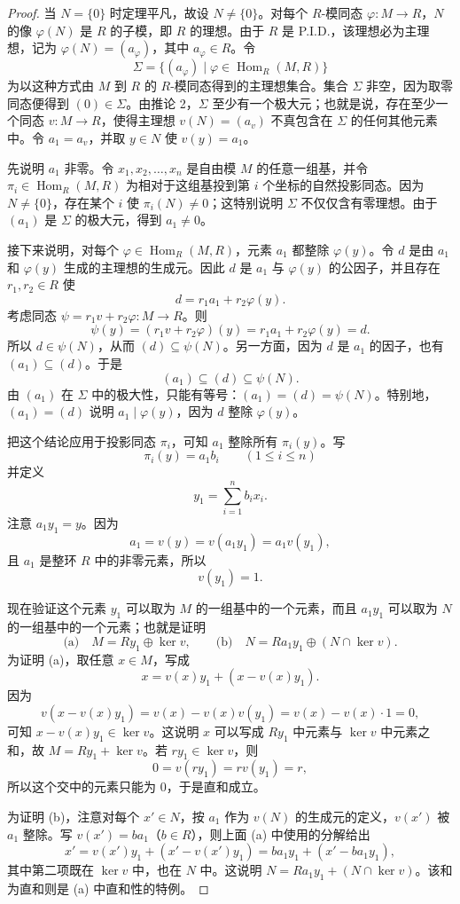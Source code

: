 \begin{proof}
当 $N=\{0\}$ 时定理平凡，故设 $N\neq\{0\}$。对每个 $R$-模同态 $\varphi:M\to R$，$N$ 的像 $\varphi(N)$ 是 $R$ 的子模，即 $R$ 的理想。由于 $R$ 是 P.I.D.，该理想必为主理想，记为 $\varphi(N)=(a_\varphi)$，其中 $a_\varphi\in R$。令
\[
\Sigma=\{(a_\varphi)\mid \varphi\in\operatorname{Hom}_R(M,R)\}
\]
为以这种方式由 $M$ 到 $R$ 的 $R$-模同态得到的主理想集合。集合 $\Sigma$ 非空，因为取零同态便得到 $(0)\in\Sigma$。由推论 2，$\Sigma$ 至少有一个极大元；也就是说，存在至少一个同态 $v:M\to R$，使得主理想 $v(N)=(a_v)$ 不真包含在 $\Sigma$ 的任何其他元素中。令 $a_1=a_v$，并取 $y\in N$ 使 $v(y)=a_1$。

先说明 $a_1$ 非零。令 $x_1,x_2,\ldots,x_n$ 是自由模 $M$ 的任意一组基，并令 $\pi_i\in\operatorname{Hom}_R(M,R)$ 为相对于这组基投到第 $i$ 个坐标的自然投影同态。因为 $N\neq\{0\}$，存在某个 $i$ 使 $\pi_i(N)\neq0$；这特别说明 $\Sigma$ 不仅仅含有零理想。由于 $(a_1)$ 是 $\Sigma$ 的极大元，得到 $a_1\neq0$。

接下来说明，对每个 $\varphi\in\operatorname{Hom}_R(M,R)$，元素 $a_1$ 都整除 $\varphi(y)$。令 $d$ 是由 $a_1$ 和 $\varphi(y)$ 生成的主理想的生成元。因此 $d$ 是 $a_1$ 与 $\varphi(y)$ 的公因子，并且存在 $r_1,r_2\in R$ 使
\[
d=r_1a_1+r_2\varphi(y).
\]
考虑同态 $\psi=r_1v+r_2\varphi:M\to R$。则
\[
\psi(y)=(r_1v+r_2\varphi)(y)=r_1a_1+r_2\varphi(y)=d.
\]
所以 $d\in\psi(N)$，从而 $(d)\subseteq\psi(N)$。另一方面，因为 $d$ 是 $a_1$ 的因子，也有 $(a_1)\subseteq(d)$。于是
\[
(a_1)\subseteq(d)\subseteq\psi(N).
\]
由 $(a_1)$ 在 $\Sigma$ 中的极大性，只能有等号：$(a_1)=(d)=\psi(N)$。特别地，$(a_1)=(d)$ 说明 $a_1\mid\varphi(y)$，因为 $d$ 整除 $\varphi(y)$。

把这个结论应用于投影同态 $\pi_i$，可知 $a_1$ 整除所有 $\pi_i(y)$。写
\[
\pi_i(y)=a_1b_i\qquad(1\leq i\leq n)
\]
并定义
\[
y_1=\sum_{i=1}^n b_ix_i.
\]
注意 $a_1y_1=y$。因为
\[
a_1=v(y)=v(a_1y_1)=a_1v(y_1),
\]
且 $a_1$ 是整环 $R$ 中的非零元素，所以
\[
v(y_1)=1.
\]

现在验证这个元素 $y_1$ 可以取为 $M$ 的一组基中的一个元素，而且 $a_1y_1$ 可以取为 $N$ 的一组基中的一个元素；也就是证明
\[
\text{(a)}\quad M=Ry_1\oplus\ker v,
\qquad
\text{(b)}\quad N=Ra_1y_1\oplus (N\cap\ker v).
\]
为证明 (a)，取任意 $x\in M$，写成
\[
x=v(x)y_1+(x-v(x)y_1).
\]
因为
\[
v(x-v(x)y_1)=v(x)-v(x)v(y_1)=v(x)-v(x)\cdot1=0,
\]
可知 $x-v(x)y_1\in\ker v$。这说明 $x$ 可以写成 $Ry_1$ 中元素与 $\ker v$ 中元素之和，故 $M=Ry_1+\ker v$。若 $ry_1\in\ker v$，则
\[
0=v(ry_1)=rv(y_1)=r,
\]
所以这个交中的元素只能为 $0$，于是直和成立。

为证明 (b)，注意对每个 $x'\in N$，按 $a_1$ 作为 $v(N)$ 的生成元的定义，$v(x')$ 被 $a_1$ 整除。写 $v(x')=ba_1$（$b\in R$），则上面 (a) 中使用的分解给出
\[
x'=v(x')y_1+(x'-v(x')y_1)=ba_1y_1+(x'-ba_1y_1),
\]
其中第二项既在 $\ker v$ 中，也在 $N$ 中。这说明 $N=Ra_1y_1+(N\cap\ker v)$。该和为直和则是 (a) 中直和性的特例。


\end{proof}
